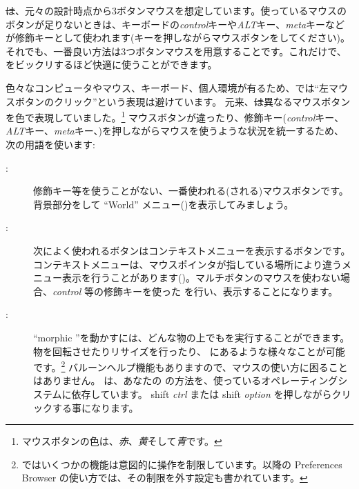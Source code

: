 \documentclass[a4paper,10pt,twoside]{book}
\begin{document}
\st は、元々の設計時点から3ボタンマウスを想定しています。使っているマウスのボタンが足りないときは、キーボードの\emph{control}キーや\emph{ALT}キー、\emph{meta}キーなどが修飾キーとして使われます(キーを押しながらマウスボタンを\click してください)。それでも、一番良い方法は3つボタンマウスを用意することです。これだけで、\pharo をビックリするほど快適に使うことができます。

色々なコンピュータやマウス、キーボード、個人環境が有るため、\pharo では``左マウスボタンのクリック''という表現は避けています。
元来、\st は異なるマウスボタンを色で表現していました。\footnote{マウスボタンの色は、\emph{赤}、\emph{黄}そして\emph{青}です。}
マウスボタンが違ったり、修飾キー(\emph{control}キー、\emph{ALT}キー、\emph{meta}キー、\etc)を押しながらマウスを使うような状況を統一するため、次の用語を使います:
\begin{description}
\item [\click:] 修飾キー等を使うことがない、一番使われる(\click される)マウスボタンです。背景部分を\click して ``World'' メニュー()を表示してみましょう。
\item [\actclick:] 次によく使われるボタンはコンテキストメニューを表示するボタンです。コンテキストメニューは、マウスポインタが指している場所により違うメニュー表示を行うことがあります()。マルチボタンのマウスを使わない場合、\emph{control} 等の修飾キーを使った \actclick を行い、表示することになります。
\item [\metaclick:] ``morphic ''を動かすには、どんな物の上でも\metaclick を実行することができます。物を回転させたりリサイズを行ったり、 にあるような様々なことが可能です。\footnote{\pharo ではいくつかの機能は意図的に操作を制限しています。以降の Preferences Browser の使い方では、その制限を外す設定も書かれています。}
バルーンヘルプ機能もありますので、マウスの使い方に困ることはありません。
\pharo は、あなたの \metaclick の方法を、使っているオペレーティングシステムに依存しています。
{\sc shift} \emph{ctrl} または {\sc shift} \emph{option} を押しながらクリックする事になります。
\end{description}
\end{document}
